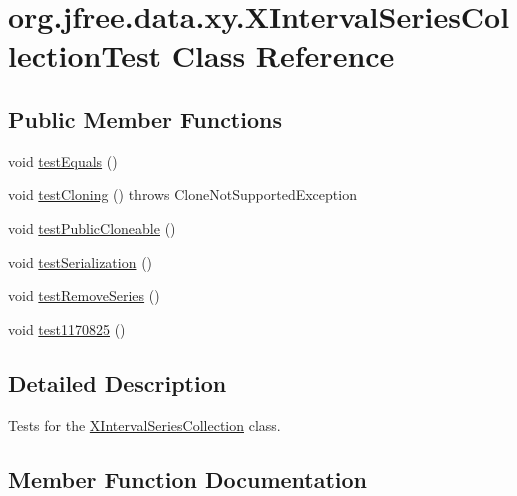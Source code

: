 \hypertarget{classorg_1_1jfree_1_1data_1_1xy_1_1_x_interval_series_collection_test}{}\section{org.\+jfree.\+data.\+xy.\+X\+Interval\+Series\+Collection\+Test Class Reference}
\label{classorg_1_1jfree_1_1data_1_1xy_1_1_x_interval_series_collection_test}
\subsection*{Public Member Functions}
\begin{DoxyCompactItemize}
\item 
void \mbox{\hyperlink{classorg_1_1jfree_1_1data_1_1xy_1_1_x_interval_series_collection_test_ab4e793050df6ea3d63db84512b31e37b}{test\+Equals}} ()
\item 
void \mbox{\hyperlink{classorg_1_1jfree_1_1data_1_1xy_1_1_x_interval_series_collection_test_ac7808f7e9390449cca7e126be8641fbf}{test\+Cloning}} ()  throws Clone\+Not\+Supported\+Exception 
\item 
void \mbox{\hyperlink{classorg_1_1jfree_1_1data_1_1xy_1_1_x_interval_series_collection_test_a60e3cc6b208cf0cee2e5b72368a919fb}{test\+Public\+Cloneable}} ()
\item 
void \mbox{\hyperlink{classorg_1_1jfree_1_1data_1_1xy_1_1_x_interval_series_collection_test_a8ac49cea40296cfa3427ea3c646adfec}{test\+Serialization}} ()
\item 
void \mbox{\hyperlink{classorg_1_1jfree_1_1data_1_1xy_1_1_x_interval_series_collection_test_a584197f8fc0b2eb6ebb0395785b100d9}{test\+Remove\+Series}} ()
\item 
void \mbox{\hyperlink{classorg_1_1jfree_1_1data_1_1xy_1_1_x_interval_series_collection_test_a4b270c6c04844a951943d910e570084d}{test1170825}} ()
\end{DoxyCompactItemize}


\subsection{Detailed Description}
Tests for the \mbox{\hyperlink{classorg_1_1jfree_1_1data_1_1xy_1_1_x_interval_series_collection}{X\+Interval\+Series\+Collection}} class. 

\subsection{Member Function Documentation}
\mbox{\label{classorg_1_1jfree_1_1data_1_1xy_1_1_x_interval_series_collection_test_a4b270c6c04844a951943d910e570084d}} 
